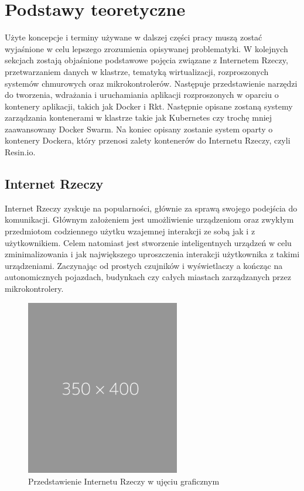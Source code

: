 \documentclass[12pt]{report}
\let\Oldsection\section
\renewcommand{\section}{\FloatBarrier\Oldsection}
\begin{document}
\chapter{Podstawy teoretyczne}\label{chap:background}
Użyte koncepcje i terminy używane w dalszej części pracy muszą zostać wyjaśnione w celu lepszego zrozumienia opisywanej problematyki. W kolejnych sekcjach zostają objaśnione podstawowe pojęcia związane z Internetem Rzeczy, przetwarzaniem danych w klastrze, tematyką wirtualizacji, rozproszonych systemów chmurowych oraz mikrokontrolerów. Następuje przedstawienie narzędzi do tworzenia, wdrażania i uruchamiania aplikacji rozproszonych w oparciu o kontenery aplikacji, takich jak Docker i Rkt. Następnie opisane zostaną systemy zarządzania kontenerami w klastrze takie jak Kubernetes czy trochę mniej zaawansowany Docker Swarm. Na koniec opisany zostanie system oparty o kontenery Dockera, który przenosi zalety kontenerów do Internetu Rzeczy, czyli Resin.io.

\section{Internet Rzeczy}
Internet Rzeczy zyskuje na popularności, głównie za sprawą swojego podejścia do komunikacji. Głównym założeniem jest umożliwienie urządzeniom oraz zwykłym przedmiotom codziennego użytku wzajemnej interakcji ze sobą jak i z użytkownikiem. Celem natomiast jest stworzenie inteligentnych urządzeń w celu zminimalizowania i jak największego uproszczenia interakcji użytkownika z takimi urządzeniami. Zaczynając od prostych czujników i wyświetlaczy a kończąc na autonomicznych pojazdach, budynkach czy całych miastach zarządzanych przez mikrokontrolery. 

\begin{figure}[h]
	\centering
	\includegraphics[width=0.6\textwidth]{images/placeholder.png}
	\caption{Przedstawienie Internetu Rzeczy w ujęciu graficznym}
\end{figure}
\end{document}

